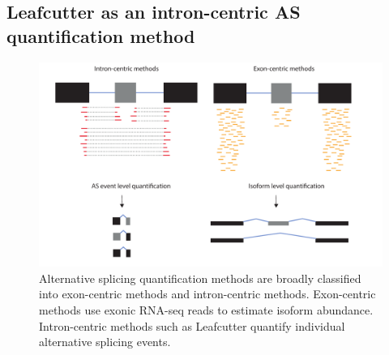 \subsection{Leafcutter as an intron-centric AS quantification method}
\begin{figure}
    \centering
    \includegraphics[width=\textwidth]{intron_exon_centric}
    \caption[Broad classification of alternative splicing quantification methods]{Alternative splicing quantification methods are broadly classified into exon-centric methods and intron-centric methods. Exon-centric methods use exonic RNA-seq reads to estimate isoform abundance. Intron-centric methods such as Leafcutter quantify individual alternative splicing events. }
    \label{fig:intron_exon_centric}   
  \end{figure}
